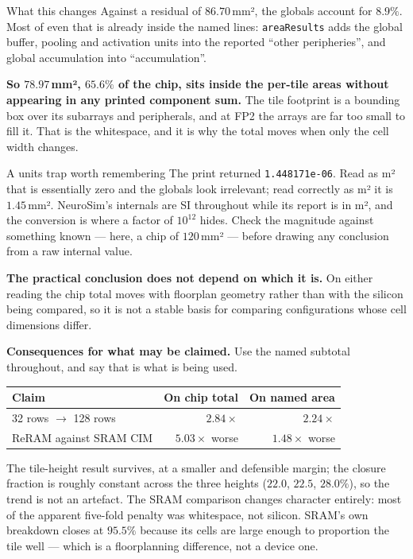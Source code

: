 \documentclass[11pt,a4paper]{report}
\begin{document}
\begin{keybox}{What this changes}
Against a residual of $86.70$\,mm², the globals account for $8.9\%$. Most of
even that is already inside the named lines: \texttt{areaResults} adds the
global buffer, pooling and activation units into the reported ``other
peripheries'', and global accumulation into ``accumulation''.

\textbf{So $78.97$\,mm², $65.6\%$ of the chip, sits inside the per-tile areas
without appearing in any printed component sum.} The tile footprint is a
bounding box over its subarrays and peripherals, and at FP2 the arrays are far
too small to fill it. That is the whitespace, and it is why the total moves
when only the cell width changes.

\begin{keybox}{A units trap worth remembering}
The print returned \texttt{1.448171e-06}. Read as \textmu m² that is
essentially zero and the globals look irrelevant; read correctly as m² it is
$1.45$\,mm². NeuroSim's internals are SI throughout while its report is in
\textmu m², and the conversion is where a factor of $10^{12}$ hides. Check the
magnitude against something known --- here, a chip of $120$\,mm² --- before
drawing any conclusion from a raw internal value.
\end{keybox}

\textbf{The practical conclusion does not depend on which it is.} On either
reading the chip total moves with floorplan geometry rather than with the
silicon being compared, so it is not a stable basis for comparing
configurations whose cell dimensions differ.

\textbf{Consequences for what may be claimed.} Use the named subtotal
throughout, and say that is what is being used.

\begin{center}\small
\begin{tabular}{lrr}
\toprule
Claim & On chip total & \textbf{On named area} \\
\midrule
32 rows $\to$ 128 rows & $2.84\times$ & $\mathbf{2.24\times}$ \\
ReRAM against SRAM CIM & $5.03\times$ worse & $\mathbf{1.48\times}$ worse \\
\bottomrule
\end{tabular}
\end{center}

The tile-height result survives, at a smaller and defensible margin; the
closure fraction is roughly constant across the three heights ($22.0$, $22.5$,
$28.0\%$), so the trend is not an artefact. The SRAM comparison changes
character entirely: most of the apparent five-fold penalty was whitespace, not
silicon. SRAM's own breakdown closes at $95.5\%$ because its cells are large
enough to proportion the tile well --- which is a floorplanning difference, not
a device one.
\end{keybox}
\end{document}
